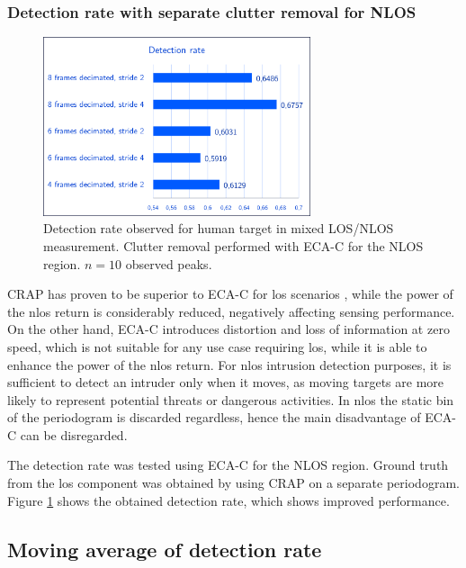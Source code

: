 \subsubsection{Detection rate with separate clutter removal for NLOS}

\begin{figure}[H]
	\centering
	\includegraphics[width=0.7\textwidth]{Images/Test1/detect_hist/detect_hist_human_ECAC_LMsans.png}
	\caption{\small Detection rate observed for human target in mixed LOS/NLOS measurement. Clutter removal performed with ECA-C for the NLOS region. $n=10$ observed peaks.}
	\label{fig:Test1_detect_hist_crap-ecac}
\end{figure}
CRAP has proven to be superior to ECA-C for \gls{los} scenarios \cite{Henninger_CRAP_2023}, while the power of the \gls{nlos} return is considerably reduced, negatively affecting sensing performance.
On the other hand, ECA-C introduces distortion and loss of information at zero speed, which is not suitable for any use case requiring \gls{los}, while it is able to enhance the power of the \gls{nlos} return. For \gls{nlos} intrusion detection purposes, it is sufficient to detect an intruder only when it moves, as moving targets are more likely to represent potential threats or dangerous activities.
In \gls{nlos} the static bin of the periodogram is discarded regardless, hence the main disadvantage of ECA-C can be disregarded.

The detection rate was tested using ECA-C for the NLOS region.
Ground truth from the \gls{los} component was obtained by using CRAP on a separate periodogram.
Figure \ref{fig:Test1_detect_hist_crap-ecac} shows the obtained detection rate, which shows improved performance.


\subsection{Moving average of detection rate}

